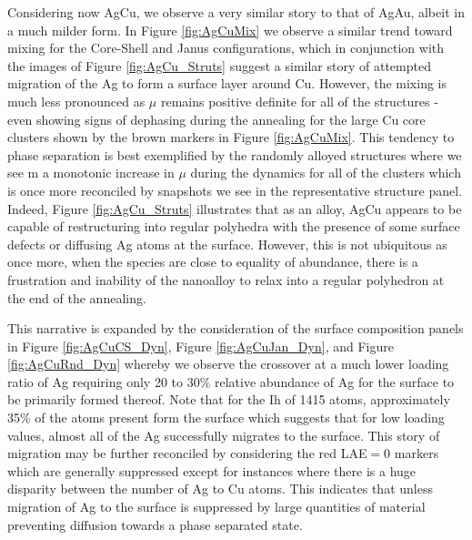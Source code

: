 Considering now AgCu, we observe a very similar story to that of AgAu, albeit in a much milder form. In Figure \ref{fig:AgCuMix} we observe a similar trend toward mixing for the Core-Shell and Janus configurations, which in conjunction with the images of Figure \ref{fig:AgCu_Struts} suggest a similar story of attempted migration of the Ag to form a surface layer around Cu. However, the mixing is much less pronounced as $\mu$ remains positive definite for all of the structures - even showing signs of dephasing during the annealing for the large Cu core clusters shown by the brown markers in Figure \ref{fig:AgCuMix}. This tendency to phase separation is best exemplified by the randomly alloyed structures where we see m a monotonic increase in $\mu$ during the dynamics for all of the clusters which is once more reconciled by snapshots we see in the representative structure panel. Indeed, Figure \ref{fig:AgCu_Struts} illustrates that as an alloy, AgCu appears to be capable of restructuring into regular polyhedra with the presence of some surface defects or diffusing Ag atoms at the surface. However, this is not ubiquitous as once more, when the species are close to equality of abundance, there is a frustration and inability of the nanoalloy to relax into a regular polyhedron at the end of the annealing.

This narrative is expanded by the consideration of the surface composition panels in Figure \ref{fig:AgCuCS_Dyn}, Figure \ref{fig:AgCuJan_Dyn}, and Figure \ref{fig:AgCuRnd_Dyn} whereby we observe the crossover at a much lower loading ratio of Ag requiring only 20 to 30\% relative abundance of Ag for the surface to be primarily formed thereof. Note that for the Ih of 1415 atoms, approximately 35\% of the atoms present form the surface which suggests that for low loading values, almost all of the Ag successfully migrates to the surface. This story of migration may be further reconciled by considering the red LAE$=0$ markers which are generally suppressed except for instances where there is a huge disparity between the number of Ag to Cu atoms. This indicates that unless migration of Ag to the surface is suppressed by large quantities of material preventing diffusion towards a phase separated state.

